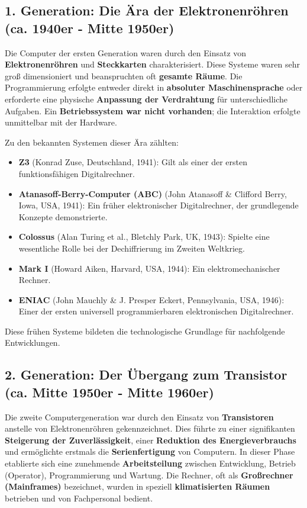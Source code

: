\subsection{1. Generation: Die Ära der Elektronenröhren (ca. 1940er - Mitte 1950er)}

Die Computer der ersten Generation waren durch den Einsatz von
\textbf{Elektronenröhren} und \textbf{Steckkarten} charakterisiert. Diese
Systeme waren sehr groß dimensioniert und beanspruchten oft \textbf{gesamte
    Räume}. Die Programmierung erfolgte entweder direkt in \textbf{absoluter
    Maschinensprache} oder erforderte eine physische \textbf{Anpassung der
    Verdrahtung} für unterschiedliche Aufgaben. Ein \textbf{Betriebssystem war
    nicht vorhanden}; die Interaktion erfolgte unmittelbar mit der Hardware.

Zu den bekannten Systemen dieser Ära zählten:
\begin{itemize}
    \item \textbf{Z3} (Konrad Zuse, Deutschland, 1941): Gilt als einer der ersten funktionsfähigen Digitalrechner.
    \item \textbf{Atanasoff-Berry-Computer (ABC)} (John Atanasoff \& Clifford Berry, Iowa, USA, 1941): Ein früher elektronischer Digitalrechner, der grundlegende Konzepte demonstrierte.
    \item \textbf{Colossus} (Alan Turing et al., Bletchly Park, UK, 1943): Spielte eine wesentliche Rolle bei der Dechiffrierung im Zweiten Weltkrieg.
    \item \textbf{Mark I} (Howard Aiken, Harvard, USA, 1944): Ein elektromechanischer Rechner.
    \item \textbf{ENIAC} (John Mauchly \& J. Presper Eckert, Pennsylvania, USA, 1946): Einer der ersten universell programmierbaren elektronischen Digitalrechner.
\end{itemize}
Diese frühen Systeme bildeten die technologische Grundlage für nachfolgende Entwicklungen.

\subsection{2. Generation: Der Übergang zum Transistor (ca. Mitte 1950er - Mitte 1960er)}

Die zweite Computergeneration war durch den Einsatz von \textbf{Transistoren}
anstelle von Elektronenröhren gekennzeichnet. Dies führte zu einer
signifikanten \textbf{Steigerung der Zuverlässigkeit}, einer \textbf{Reduktion
    des Energieverbrauchs} und ermöglichte erstmals die \textbf{Serienfertigung}
von Computern. In dieser Phase etablierte sich eine zunehmende
\textbf{Arbeitsteilung} zwischen Entwicklung, Betrieb (Operator),
Programmierung und Wartung. Die Rechner, oft als \textbf{Großrechner
    (Mainframes)} bezeichnet, wurden in speziell \textbf{klimatisierten Räumen}
betrieben und von Fachpersonal bedient.

